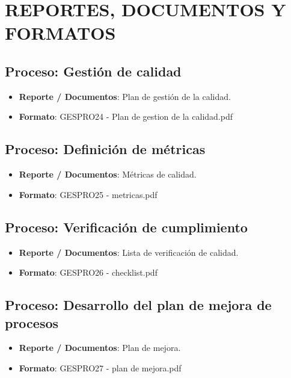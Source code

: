 \chapter{REPORTES, DOCUMENTOS Y FORMATOS}
%
\section{Proceso: Gesti\'on de calidad}
%
\begin{itemize}
	\item \textbf{Reporte / Documentos}: Plan de gesti\'on de la calidad.
	\item \textbf{Formato}: GESPRO24 - Plan de gestion de la calidad.pdf
\end{itemize}
%
%
\section{Proceso: Definici\'on de m\'etricas}
%
\begin{itemize}
	\item \textbf{Reporte / Documentos}: M\'etricas de calidad.
	\item \textbf{Formato}: GESPRO25 - metricas.pdf
\end{itemize}
%
\section{Proceso: Verificaci\'on de cumplimiento}
%
\begin{itemize}
	\item \textbf{Reporte / Documentos}: Lista de verificaci\'on de calidad.
	\item \textbf{Formato}: GESPRO26 - checklist.pdf
\end{itemize}
%
\section{Proceso: Desarrollo del plan de mejora de procesos}
%
\begin{itemize}
	\item \textbf{Reporte / Documentos}: Plan de mejora.
	\item \textbf{Formato}: GESPRO27 - plan de mejora.pdf
\end{itemize}
%
